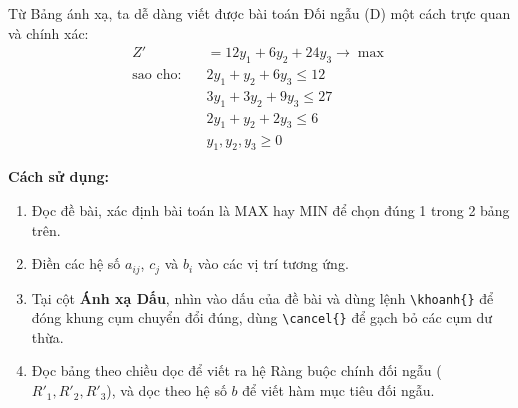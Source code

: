 \noindent Từ Bảng ánh xạ, ta dễ dàng viết được bài toán Đối ngẫu (D) một cách trực quan và chính xác:
\begin{align*}
    Z' &= 12y_1 + 6y_2 + 24y_3 \rightarrow \max \\
\text{sao cho:} \quad
    &2y_1 + y_2 + 6y_3 \le 12 \\
    &3y_1 + 3y_2 + 9y_3 \le 27 \\
    &2y_1 + y_2 + 2y_3 \le 6 \\
    &y_1, y_2, y_3 \ge 0
\end{align*}

\textbf{Cách sử dụng:}
\begin{enumerate}
    \item Đọc đề bài, xác định bài toán là MAX hay MIN để chọn đúng 1 trong 2 bảng trên.
    \item Điền các hệ số $a_{ij}$, $c_j$ và $b_i$ vào các vị trí tương ứng.
    \item Tại cột \textbf{Ánh xạ Dấu}, nhìn vào dấu của đề bài và dùng lệnh \verb|\khoanh{}| để đóng khung cụm chuyển đổi đúng, dùng \verb|\cancel{}| để gạch bỏ các cụm dư thừa.
    \item Đọc bảng theo chiều dọc để viết ra hệ Ràng buộc chính đối ngẫu ($R'_1, R'_2, R'_3$), và dọc theo hệ số $b$ để viết hàm mục tiêu đối ngẫu.
\end{enumerate}